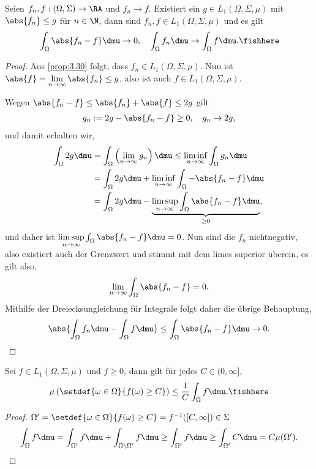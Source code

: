 \begin{prop}
\label{prop:3.37}
Seien $f_n,f: (\Omega,\Sigma)\to\RA$ und $f_n\to f$. Existiert ein $g\in
L_1(\Omega,\Sigma,\mu)$ mit $\abs{f_n}\le g$ für $n\in\N$, dann sind $f_n,f\in
L_1(\Omega,\Sigma,\mu)$ und es gilt
\begin{align*}
\int_\Omega \abs{f_n-f} \dmu \to 0,\quad
\int_\Omega f_n\dmu \to \int_\Omega f\dmu.\fishhere  
\end{align*}
\end{prop}
\begin{proof}
Aus \ref{prop:3.30} folgt, dass $f_n\in L_1(\Omega,\Sigma,\mu)$. Nun ist
$\abs{f} = \lim\limits_{n\to\infty} \abs{f_n} \le g$, also ist auch $f\in
L_1(\Omega,\Sigma,\mu)$.

Wegen $\abs{f_n-f} \le \abs{f_n}+\abs{f} \le 2g$ gilt
\begin{align*}
g_n := 2g - \abs{f_n-f} \ge 0,\quad
 g_n\to 2g,
\end{align*}
und damit erhalten wir, 
\begin{align*}
\int_\Omega 2 g \dmu &= \int_\Omega
\left(\lim\limits_{n\to\infty} g_n\right) \dmu
\le \liminf\limits_{n\to\infty} \int_\Omega g_n\dmu \\ &= \int_\Omega 2g\dmu +
\liminf\limits_{n\to\infty} \int_\Omega -\abs{f_n-f}\dmu
\\ &= \int_\Omega 2g \dmu - \underbrace{\limsup\limits_{n\to\infty} \int_\Omega
\abs{f_n-f}\dmu}_{\ge 0},
\end{align*}
und daher ist $\limsup\limits_{n\to\infty} \int_\Omega \abs{f_n-f} \dmu = 0$.
Nun sind die $f_n$ nichtnegativ, also existiert auch der Grenzwert und stimmt
mit dem limes superior überein, es gilt also,
\begin{align*}
\lim\limits_{n\to\infty} \int_\Omega \abs{f_n-f} = 0.
\end{align*}
Mithilfe der Dreiecksungleichung für Integrale folgt daher die übrige
Behauptung,
\begin{align*}
\abs{\int_\Omega f_n\dmu - \int_\Omega f \dmu} \le \int_\Omega \abs{f_n-f}\dmu
\to 0.\qedhere
\end{align*}
\end{proof}

\begin{prop}
\label{prop:3.38}
Sei $f\in L_1(\Omega,\Sigma,\mu)$ und $f\ge 0$, dann gilt für
jedes $C\in(0,\infty]$,
\begin{align*}
\mu\left(\setdef{\omega\in\Omega}{f(\omega)\ge C}\right)
\le \frac{1}{C} \int_\Omega f\dmu.\fishhere
\end{align*}
\end{prop}
\begin{proof}
$\Omega' = \setdef{\omega\in\Omega}{f(\omega)\ge C} =
f^{-1}([C,\infty])\in\Sigma$
\begin{align*}
\int_\Omega f\dmu = \int_{\Omega'} f\dmu + \int_{\Omega\setminus\Omega'} f\dmu
\ge \int_{\Omega'} f\dmu  \ge \int_{\Omega'} C \dmu  = C\mu(\Omega').\qedhere   
\end{align*}
\end{proof}


